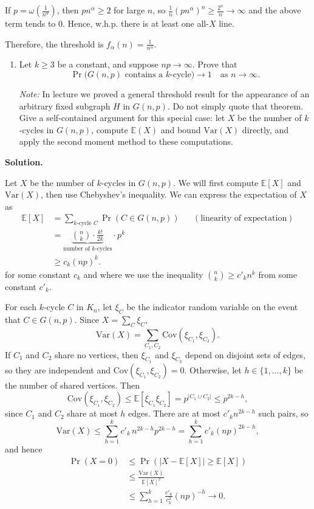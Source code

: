 \documentclass[11pt,letterpaper]{article}
\theoremstyle{definition}
\newcommand{\EE}{\mathbb{E}}
\newcommand{\solution}{\medskip\noindent\textbf{Solution.}\par\medskip}
\newcommand{\Var}{\mathrm{Var}}
\begin{document}
If $p = \omega\left(\frac{1}{n^\alpha}\right)$, then $pn^\alpha\geq 2$ for large $n$, so $\frac{1}{n}(pn^\alpha)^n \geq \frac{2^n}{n}\to\infty$ and the above term tends to $0$.
Hence, w.h.p. there is at least one all-$X$ line. 

Therefore, the threshold is $f_\alpha(n) = \frac{1}{n^\alpha}$.

\begin{enumerate}[resume]
\item Let $k\geq 3$ be a constant, and suppose $np\to\infty$. Prove that
\[
\Pr\bigl(G(n,p)\text{ contains a $k$-cycle}\bigr)\to 1 \quad\text{as } n\to\infty.
\]

\emph{Note:} In lecture we proved a general threshold result for the appearance of an arbitrary fixed subgraph $H$ in $G(n,p)$. Do not simply quote that theorem. Give a self-contained argument for this special case: let $X$ be the number of $k$-cycles in $G(n,p)$, compute $\EE(X)$ and bound $\Var(X)$ directly, and apply the second moment method to these computations.
\end{enumerate}

\solution
Let $X$ be the number of $k$-cycles in $G(n,p)$. 
We will first compute $\EE[X]$ and $\Var(X)$, then use Chebyshev's inequality.
We can express the expectation of $X$ as
\begin{align*}
    \EE[X] &=\sum_{k\text{-cycle }C} \Pr(C\in G(n,p)) && (\text{linearity of expectation}) \\
    &=\underbrace{\binom{n}{k}\cdot\frac{k!}{2k}}_{\text{number of }k\text{-cycles}}\cdot p^k \\
    &\geq c_k(np)^{k}.
\end{align*}
for some constant $c_k$ and where we use the inequality $\binom{n}{k}\geq c'_k n^k$ from some constant $c'_k$. 

For each $k$-cycle $C$ in $K_n$, let $\xi_C$ be the indicator random variable on the event that $C\in G(n,p)$. 
Since $X = \sum_C \xi_C$,
\[
    \Var(X) = \sum_{C_1,C_2} \mathrm{Cov}(\xi_{C_1},\xi_{C_2}).
\]
If $C_1$ and $C_2$ share no vertices, then $\xi_{C_1}$ and $\xi_{C_2}$ depend on disjoint sets of
edges, so they are independent and $\mathrm{Cov}(\xi_{C_1},\xi_{C_2}) = 0$. Otherwise, let $h \in \{1,\dots,k\}$
be the number of shared vertices. Then
\[
    \mathrm{Cov}(\xi_{C_1},\xi_{C_2}) \le \EE[\xi_{C_1}\xi_{C_2}] = p^{|C_1\cup C_2|} \le p^{2k-h},
\]
since $C_1$ and $C_2$ share at most $h$ edges. There are at most $c'_k n^{2k-h}$ such pairs, so
\[
    \Var(X) \le \sum_{h=1}^{k} c'_k\, n^{2k-h} p^{2k-h} = \sum_{h=1}^{k} c'_k (np)^{2k-h},
\]
and hence
\begin{align*}
    \Pr(X=0) &\leq \Pr(|X-\EE[X]|\geq \EE[X]) \\
     &\le \frac{\Var(X)}{\EE[X]^2} \\
     &\le \sum_{h=1}^{k} \frac{c'_k}{c_k^2}(np)^{-h} \to 0.
\end{align*}
    
\end{document}
